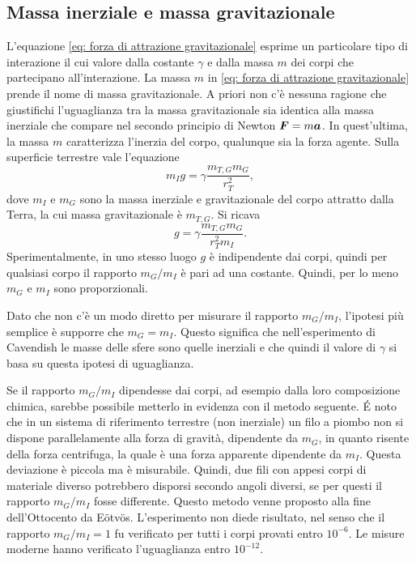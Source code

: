 \subsection{Massa inerziale e massa gravitazionale}
L'equazione \eqref{eq: forza di attrazione gravitazionale} esprime un particolare tipo di interazione il cui valore dalla costante $\gamma$ e dalla massa $m$ dei corpi che partecipano all'interazione. La massa $m$ in \eqref{eq: forza di attrazione gravitazionale} prende il nome di massa gravitazionale. A priori non c'è nessuna ragione che giustifichi l'uguaglianza tra la massa gravitazionale sia identica alla massa inerziale che compare nel secondo principio di Newton $\bm{F}=m\bm{a}$. In quest'ultima, la massa $m$ caratterizza l'inerzia del corpo, qualunque sia la forza agente. Sulla superficie terrestre vale l'equazione
\begin{equation}
    m_Ig=\gamma\frac{m_{T,G}m_G}{r_T^2},
\end{equation}
dove $m_I$ e $m_G$ sono la massa inerziale e gravitazionale del corpo attratto dalla Terra, la cui massa gravitazionale è $m_{T,G}$. Si ricava
\begin{equation}
    g=\gamma\frac{m_{T,G}m_G}{r_T^2m_I}.
\end{equation}
Sperimentalmente, in uno stesso luogo $g$ è indipendente dai corpi, quindi per qualsiasi corpo il rapporto $m_G/m_I$ è pari ad una costante. Quindi, per lo meno $m_G$ e $m_I$ sono proporzionali. 

Dato che non c'è un modo diretto per misurare il rapporto $m_G/m_I$, l'ipotesi più semplice è supporre che $m_G=m_I$. Questo significa che nell'esperimento di Cavendish le masse delle sfere sono quelle inerziali e che quindi il valore di $\gamma$ si basa su questa ipotesi di uguaglianza. 

Se il rapporto $m_G/m_I$ dipendesse dai corpi, ad esempio dalla loro composizione chimica, sarebbe possibile metterlo in evidenza con il metodo seguente. \'E noto che in un sistema di riferimento terrestre (non inerziale) un filo a piombo non si dispone parallelamente alla forza di gravità, dipendente da $m_G$, in quanto risente della forza centrifuga, la quale è una forza apparente dipendente da $m_I$. Questa deviazione è piccola ma è misurabile. Quindi, due fili con appesi corpi di materiale diverso potrebbero disporsi secondo angoli diversi, se per questi il rapporto $m_G/m_I$ fosse differente. Questo metodo venne proposto alla fine dell'Ottocento da E\"otv\"os. L'esperimento non diede risultato, nel senso che il rapporto $m_G/m_I=1$ fu verificato per tutti i corpi provati entro $10^{-6}$. Le misure moderne hanno verificato l'uguaglianza entro $10^{-12}$.

